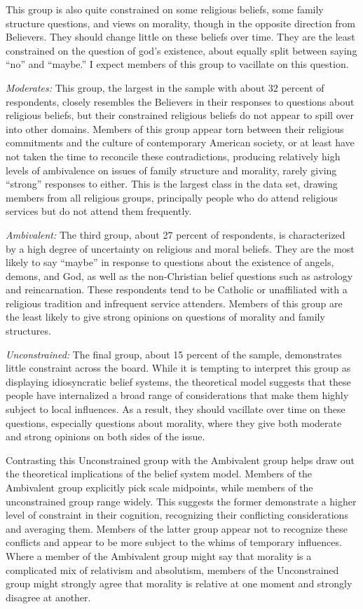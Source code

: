 \documentclass[12pt,]{article}
\begin{document}
This group is also quite constrained on some religious beliefs, some family structure questions, and views on morality, though in the opposite direction from Believers. They should change little on these beliefs over time. They are the least constrained on the question of god's existence, about equally split between saying ``no'' and ``maybe.'' I expect members of this group to vacillate on this question.

\emph{Moderates:} This group, the largest in the sample with about 32 percent of respondents, closely resembles the Believers in their responses to questions about religious beliefs, but their constrained religious beliefs do not appear to spill over into other domains. Members of this group appear torn between their religious commitments and the culture of contemporary American society, or at least have not taken the time to reconcile these contradictions, producing relatively high levels of ambivalence on issues of family structure and morality, rarely giving ``strong'' responses to either. This is the largest class in the data set, drawing members from all religious groups, principally people who do attend religious services but do not attend them frequently.

\emph{Ambivalent:} The third group, about 27 percent of respondents, is characterized by a high degree of uncertainty on religious and moral beliefs. They are the most likely to say ``maybe'' in response to questions about the existence of angels, demons, and God, as well as the non-Christian belief questions such as astrology and reincarnation. These respondents tend to be Catholic or unaffiliated with a religious tradition and infrequent service attenders. Members of this group are the least likely to give strong opinions on questions of morality and family structures.

\emph{Unconstrained:} The final group, about 15 percent of the sample, demonstrates little constraint across the board. While it is tempting to interpret this group as displaying idiosyncratic belief systems, the theoretical model suggests that these people have internalized a broad range of considerations that make them highly subject to local influences. As a result, they should vacillate over time on these questions, especially questions about morality, where they give both moderate and strong opinions on both sides of the issue.

Contrasting this Unconstrained group with the Ambivalent group helps draw out the theoretical implications of the belief system model. Members of the Ambivalent group explicitly pick scale midpoints, while members of the unconstrained group range widely. This suggests the former demonstrate a higher level of constraint in their cognition, recognizing their conflicting considerations and averaging them. Members of the latter group appear not to recognize these conflicts and appear to be more subject to the whims of temporary influences. Where a member of the Ambivalent group might say that morality is a complicated mix of relativism and absolutism, members of the Unconstrained group might strongly agree that morality is relative at one moment and strongly disagree at another.
\end{document}
